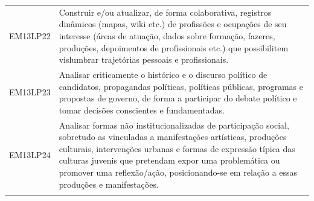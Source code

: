 \documentclass[12pt]{extarticle}
\begin{document}
\begin{longtable}{ll}
EM13LP22   & Construir e/ou atualizar, de forma colaborativa, registros dinâmicos (mapas, wiki etc.) de profissões e ocupações de seu interesse (áreas de atuação, dados sobre formação, fazeres, produções, depoimentos de profissionais etc.) que possibilitem vislumbrar trajetórias pessoais e profissionais.                                                                                                                                                                                                                                                                                                                                                                                                                                                                                                                  \\
\rowcolor[HTML]{E0F7FA} 
EM13LP23   & Analisar criticamente o histórico e o discurso político de candidatos, propagandas políticas, políticas públicas, programas e propostas de governo, de forma a participar do debate político e tomar decisões conscientes e fundamentadas.                                                                                                                                                                                                                                                                                                                                                                                                                                                                                                                                                                            \\
\rowcolor[HTML]{FFF} 
EM13LP24   & Analisar formas não institucionalizadas de participação social, sobretudo as vinculadas a manifestações artísticas, produções culturais, intervenções urbanas e formas de expressão típica das culturas juvenis que pretendam expor uma problemática ou promover uma reflexão/ação, posicionando-se em relação a essas produções e manifestações.                                                                                                                                                                                                                                                                                                                                                                                                                                                                     \\
\rowcolor[HTML]{E0F7FA} 

\end{longtable}
\end{document}

